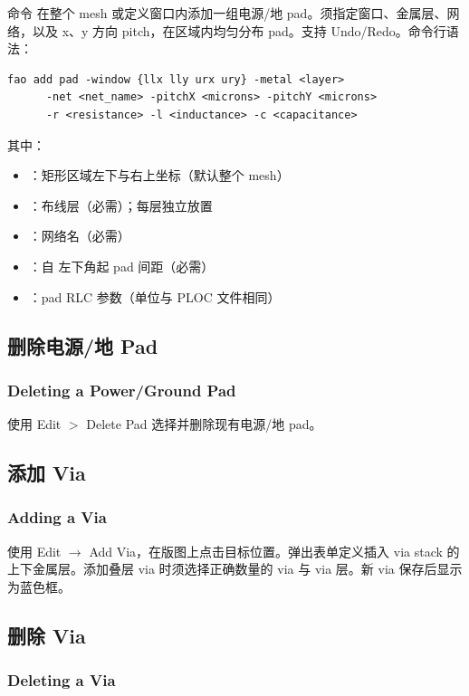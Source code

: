 命令  在整个 mesh 或定义窗口内添加一组电源/地 pad。须指定窗口、金属层、网络，以及 x、y 方向 pitch，在区域内均匀分布 pad。支持 Undo/Redo。命令行语法：
\begin{lstlisting}
fao add pad -window {llx lly urx ury} -metal <layer>
      -net <net_name> -pitchX <microns> -pitchY <microns>
      -r <resistance> -l <inductance> -c <capacitance>
\end{lstlisting}
其中：
\begin{itemize}
  \item {}：矩形区域左下与右上坐标（默认整个 mesh）
  \item {}：布线层（必需）；每层独立放置
  \item {}：网络名（必需）
  \item {}：自  左下角起 pad 间距（必需）
  \item {}：pad RLC 参数（单位与 PLOC 文件相同）
\end{itemize}

\subsection{删除电源/地 Pad}
\subsubsection*{Deleting a Power/Ground Pad}

使用 Edit $>$ Delete Pad 选择并删除现有电源/地 pad。

\subsection{添加 Via}
\subsubsection*{Adding a Via}

使用 Edit $\rightarrow$ Add Via，在版图上点击目标位置。弹出表单定义插入 via stack 的上下金属层。添加叠层 via 时须选择正确数量的 via 与 via 层。新 via 保存后显示为蓝色框。

\subsection{删除 Via}
\subsubsection*{Deleting a Via}

